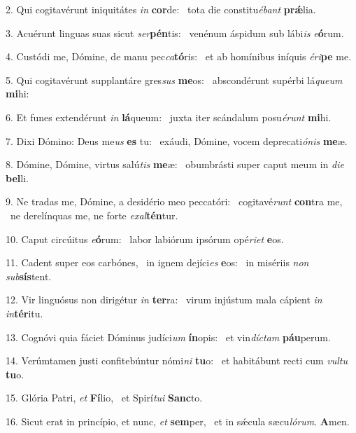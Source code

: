 2. Qui cogitavérunt iniquitátes \textit{in} \textbf{cor}de: \ast\  tota die constitu\textit{é}\textit{bant} \textbf{prǽ}lia.\

3. Acuérunt linguas suas sicut \textit{ser}\textbf{pén}tis: \ast\  venénum áspidum sub lábi\textit{is} \textit{e}\textbf{ó}rum.\

4. Custódi me, Dómine, de manu pec\textit{ca}\textbf{tó}ris: \ast\  et ab homínibus iníquis \textit{é}\textit{ri}\textbf{pe} me.\

5. Qui cogitavérunt supplantáre gres\textit{sus} \textbf{me}os: \ast\  abscondérunt supérbi lá\textit{que}\textit{um} \textbf{mi}hi:\

6. Et funes extendérunt \textit{in} \textbf{lá}queum: \ast\  juxta iter scándalum posu\textit{é}\textit{runt} \textbf{mi}hi.\

7. Dixi Dómino: Deus me\textit{us} \textbf{es} tu: \ast\  exáudi, Dómine, vocem deprecati\textit{ó}\textit{nis} \textbf{me}æ.\

8. Dómine, Dómine, virtus salú\textit{tis} \textbf{me}æ: \ast\  obumbrásti super caput meum in \textit{di}\textit{e} \textbf{bel}li.\

9. Ne tradas me, Dómine, a desidério meo peccatóri: \dag\  cogitavé\textit{runt} \textbf{con}tra me, \ast\  ne derelínquas me, ne forte \textit{ex}\textit{al}\textbf{tén}tur.\

10. Caput circúitus \textit{e}\textbf{ó}rum: \ast\  labor labiórum ipsórum opé\textit{ri}\textit{et} \textbf{e}os.\

11. Cadent super eos carbónes, \dag\  in ignem dejíci\textit{es} \textbf{e}os: \ast\  in misériis \textit{non} \textit{sub}\textbf{sís}tent.\

12. Vir linguósus non dirigétur \textit{in} \textbf{ter}ra: \ast\  virum injústum mala cápient \textit{in} \textit{in}\textbf{tér}itu.\

13. Cognóvi quia fáciet Dóminus judíci\textit{um} \textbf{ín}opis: \ast\  et vin\textit{díc}\textit{tam} \textbf{páu}perum.\

14. Verúmtamen justi confitebúntur nómi\textit{ni} \textbf{tu}o: \ast\  et habitábunt recti cum \textit{vul}\textit{tu} \textbf{tu}o.\

15. Glória Patri, \textit{et} \textbf{Fí}lio, \ast\  et Spirí\textit{tu}\textit{i} \textbf{Sanc}to.\

16. Sicut erat in princípio, et nunc, \textit{et} \textbf{sem}per, \ast\  et in sǽcula sæcu\textit{ló}\textit{rum}. \textbf{A}men.\

